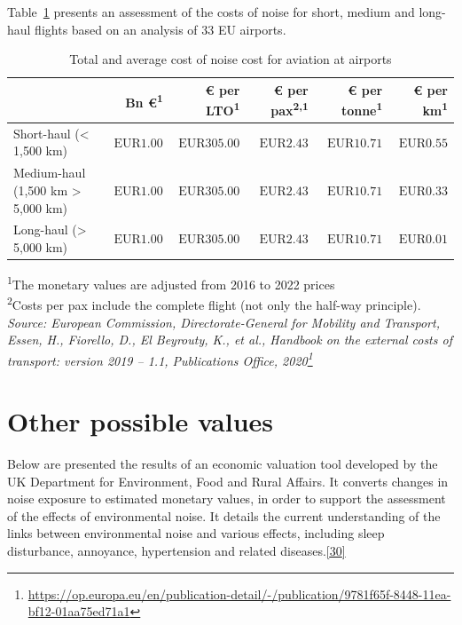 \documentclass[
  11pt,
  a4paper,
]{book}
\DeclareRobustCommand{\href}[2]{#2\footnote{\url{#1}}}
\begin{document}
Table~\ref{tbl-total-noise-cost} presents an assessment of the costs of
noise for short, medium and long-haul flights based on an analysis of 33
EU airports.

\hypertarget{tbl-total-noise-cost}{}
\setlength{\LTpost}{0mm}
\begin{longtable}{lrrrrr}
\caption{\label{tbl-total-noise-cost}Total and average cost of noise cost for aviation at airports }\tabularnewline

\toprule
  & Bn €\textsuperscript{1} & € per LTO\textsuperscript{1} & € per pax\textsuperscript{2,1} & € per tonne\textsuperscript{1} & € per km\textsuperscript{1} \\ 
\midrule
Short-haul (< 1,500 km) & $\text{EUR}1.00$ & $\text{EUR}305.00$ & $\text{EUR}2.43$ & $\text{EUR}10.71$ & $\text{EUR}0.55$ \\ 
Medium-haul (1,500 km > 5,000 km) & $\text{EUR}1.00$ & $\text{EUR}305.00$ & $\text{EUR}2.43$ & $\text{EUR}10.71$ & $\text{EUR}0.33$ \\ 
Long-haul (> 5,000 km) & $\text{EUR}1.00$ & $\text{EUR}305.00$ & $\text{EUR}2.43$ & $\text{EUR}10.71$ & $\text{EUR}0.01$ \\ 
\bottomrule
\end{longtable}
\begin{minipage}{\linewidth}
\textsuperscript{1}The monetary values are adjusted from 2016 to 2022 prices\\
\textsuperscript{2}Costs per pax include the complete flight (not only the half-way principle).\\
\emph{Source: \href{https://op.europa.eu/en/publication-detail/-/publication/9781f65f-8448-11ea-bf12-01aa75ed71a1}{European Commission, Directorate-General for Mobility and Transport, Essen, H., Fiorello, D., El Beyrouty, K., et al., Handbook on the external costs of transport: version 2019 -- 1.1, Publications Office, 2020}}\\
\end{minipage}

\hypertarget{other-possible-values-1}{%
\section{Other possible values}\label{other-possible-values-1}}

Below are presented the results of an economic valuation tool developed
by the UK Department for Environment, Food and Rural Affairs. It
converts changes in noise exposure to estimated monetary values, in
order to support the assessment of the effects of environmental noise.
It details the current understanding of the links between environmental
noise and various effects, including sleep disturbance, annoyance,
hypertension and related
diseases.\protect\hyperlink{ref-GuidanceNoisePollution}{{[}30{]}}
\end{document}

